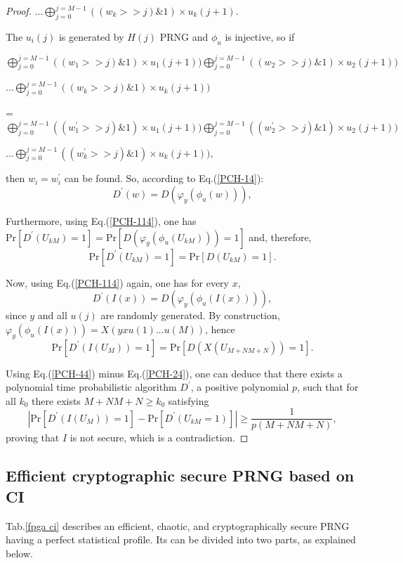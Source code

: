 \begin{proof}
\noindent $...\bigoplus_{j=0}^{j=M-1}((w_k>>j)\&1)\times u_{k}(j+1)$. 

The $u_i(j)$ is generated by $H(j)$ PRNG and $\phi_u$ is injective, so if 

\noindent $\bigoplus_{j=0}^{j=M-1}((w_1>>j)\&1)\times u_{1}(j+1))\bigoplus_{j=0}^{j=M-1}((w_2>>j)\&1)\times u_{2}(j+1))$

\noindent $\ldots \bigoplus_{j=0}^{j=M-1}((w_k>>j)\&1)\times u_{k}(j+1))$ 

\noindent = $\bigoplus_{j=0}^{j=M-1}((w_1^\prime>>j)\&1)\times u_{1}(j+1))\bigoplus_{j=0}^{j=M-1}((w_2^\prime>>j)\&1)\times u_{2}(j+1))$

\noindent $\ldots \bigoplus_{j=0}^{j=M-1}((w_k^\prime>>j)\&1)\times u_{k}(j+1)),$

\noindent then $w_i = w^\prime_i$ can be found.
So, according to 
Eq.(\ref{PCH-14}):
\begin{equation}\label{PCH-114}
D^\prime(w)=D(\varphi_y(\phi_u(w))),
\end{equation}

Furthermore, using Eq.(\ref{PCH-114}),
one has
$\mathrm{Pr}[D^\prime(U_{kM})=1]=\mathrm{Pr}[D(\varphi_y(\phi_u(U_{kM})))=1]$ and,
therefore, 
\begin{equation}\label{PCH-24}
\mathrm{Pr}[D^\prime(U_{kM})=1]=\mathrm{Pr}[D(U_{kM})=1].
\end{equation}

Now, using Eq.(\ref{PCH-114}) again, one has  for every $x$,
\begin{equation}\label{PCH-34}
D^\prime(I(x))=D(\varphi_y(\phi_u(I(x)))),
\end{equation}
since $y$ and all $u(j)$ are randomly generated. 
By construction, $\varphi_y(\phi_u(I(x)))=X(yxu(1)...u(M))$, hence
\begin{equation}\label{PCH-44}
\mathrm{Pr}[D^\prime(I(U_{M}))=1]=\mathrm{Pr}[D(X(U_{M+NM+N}))=1].
\end{equation}

Using Eq.(\ref{PCH-44}) minus Eq.(\ref{PCH-24}), one can deduce that
there exists a polynomial time probabilistic
algorithm $D^\prime$, a positive polynomial $p$, such that for all $k_0$ there exists
$M+NM+N \geq k_0$ satisfying
$$| \mathrm{Pr}[D^\prime(I(U_{M}))=1]-\mathrm{Pr}[D^\prime(U_{kM}=1)]|\geq \frac{1}{p(M+NM+N)},$$
proving that $I$ is not secure, which is a contradiction. 
\end{proof}

\subsection{Efficient cryptographic secure PRNG based on CI}
\label{prng fpga}
Tab.\ref{fpga ci} describes an efficient, chaotic, and cryptographically secure 
PRNG having a perfect statistical profile.
Its can be divided into two parts, as explained below. 


